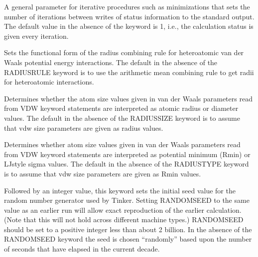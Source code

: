 \documentclass[letterpaper,11pt,english]{sphinxmanual}
\begin{document}







  A general parameter for iterative procedures such as minimizations that sets the number of iterations between writes of status information to the standard output. The default value in the absence of the keyword is 1, i.e., the calculation status is given every iteration.

  Sets the functional form of the radius combining rule for heteroatomic van der Waals potential energy interactions. The default in the absence of the RADIUSRULE keyword is to use the arithmetic mean combining rule to get radii for heteroatomic interactions.

  Determines whether the atom size values given in van der Waals parameters read from VDW keyword statements are interpreted as atomic radius or diameter values. The default in the absence of the RADIUSSIZE keyword is to assume that vdw size parameters are given as radius values.

  Determines whether atom size values given in van der Waals parameters read from VDW keyword statements are interpreted as potential minimum (Rmin) or LJ\sphinxhyphen{}style sigma values. The default in the absence of the RADIUSTYPE keyword is to assume that vdw size parameters are given as Rmin values.

  Followed by an integer value, this keyword sets the initial seed value for the random number generator used by Tinker. Setting RANDOMSEED to the same value as an earlier run will allow exact reproduction of the earlier calculation. (Note that this will not hold across different machine types.) RANDOMSEED should be set to a positive integer less than about 2 billion. In the absence of the RANDOMSEED keyword the seed is chosen “randomly” based upon the number of seconds that have elapsed in the current decade.
\end{document}
